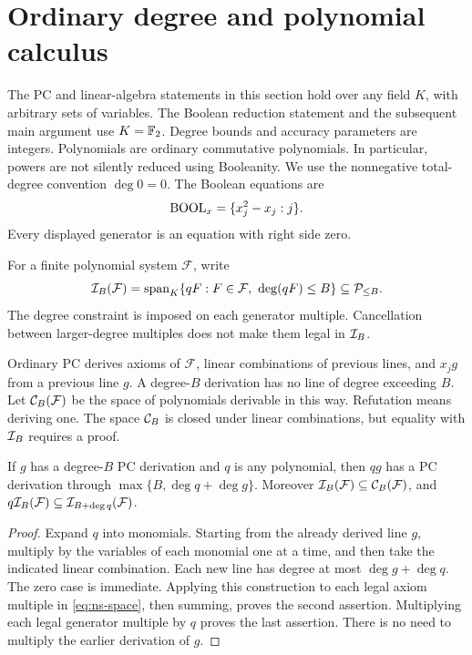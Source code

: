 \section{Ordinary degree and polynomial calculus}\label{sec:algebra}

The PC and linear-algebra statements in this section hold over any field \(K\),
with arbitrary sets of variables. The Boolean reduction statement and the
subsequent main argument use \(K=\mathbb F_2\).
Degree bounds and accuracy parameters are integers.
Polynomials are ordinary commutative polynomials. In particular, powers are
not silently reduced using Booleanity. We use the nonnegative total-degree
convention \(\deg0=0\). The Boolean equations are
\[
 \operatorname{BOOL}_x=\{x_j^2-x_j:j\}.
\]
Every displayed generator is an equation with right side zero.

For a finite polynomial system \(\mathcal F\), write
\begin{equation}\label{eq:ns-space}
 \mathcal I_B(\mathcal F)
  =\operatorname{span}_K\{qF:F\in\mathcal F,\ \deg(qF)\le B\}
   \subseteq\mathcal P_{\le B}.
\end{equation}
The degree constraint is imposed on each generator multiple. Cancellation
between larger-degree multiples does not make them legal in
\(\mathcal I_B\).

Ordinary PC derives axioms of \(\mathcal F\), linear combinations of
previous lines, and \(x_jg\) from a previous line \(g\).
A degree-\(B\) derivation has no line of degree exceeding \(B\).
Let \(\mathcal C_B(\mathcal F)\) be the space of polynomials derivable in this
way. Refutation means deriving one. The space \(\mathcal C_B\) is closed under
linear combinations, but equality with \(\mathcal I_B\) requires a proof.

\begin{lemma}\label{lem:pc-product}
If \(g\) has a degree-\(B\) PC derivation and \(q\) is any polynomial,
then \(qg\) has a PC derivation through
\(\max\{B,\deg q+\deg g\}\).
Moreover \(\mathcal I_B(\mathcal F)\subseteq\mathcal C_B(\mathcal F)\), and
\(q\mathcal I_B(\mathcal F)\subseteq\mathcal I_{B+\deg q}(\mathcal F)\).
\end{lemma}
\begin{proof}
Expand \(q\) into monomials. Starting from the already derived line \(g\),
multiply by the variables of each monomial one at a time, and then take
the indicated linear combination. Each new line has degree at most
\(\deg g+\deg q\). The zero case is immediate.
Applying this construction to each legal axiom multiple in
\eqref{eq:ns-space}, then summing, proves the second assertion.
Multiplying each legal generator multiple by \(q\) proves the last assertion.
There is no need to multiply the earlier derivation of \(g\).
\end{proof}

